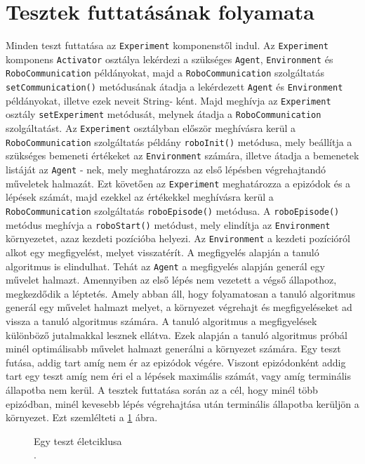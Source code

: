 \section{Tesztek futtatásának folyamata}\label{sec:TesztekFolyamata}
Minden teszt futtatása az \texttt{Experiment} komponenstől indul. Az \texttt{Experiment} komponens \texttt{Activator} osztálya lekérdezi a szükséges \texttt{Agent}, \texttt{Environment} és \texttt{RoboCommunication} példányokat, majd a \texttt{RoboCommunication} szolgáltatás \texttt{setCommunication()} metódusának átadja a lekérdezett \texttt{Agent} és \texttt{Environment} példányokat, illetve ezek neveit String- ként. Majd meghívja az \texttt{Experiment} osztály \texttt{setExperiment} metódusát, melynek átadja a \texttt{RoboCommunication} szolgáltatást. Az \texttt{Experiment} osztályban először meghívásra kerül a \texttt{RoboCommunication} szolgáltatás példány \texttt{roboInit()} metódusa, mely beállítja a szükséges bemeneti értékeket az \texttt{Environment} számára, illetve átadja a bemenetek listáját az \texttt{Agent} - nek, mely meghatározza az első lépésben végrehajtandó műveletek halmazát. Ezt követően az \texttt{Experiment} meghatározza a epizódok és a lépések számát, majd ezekkel az értékekkel meghívásra kerül a \texttt{RoboCommunication} szolgáltatás \texttt{roboEpisode()} metódusa. A \texttt{roboEpisode()} metódus meghívja a \texttt{roboStart()} metódust, mely elindítja az \texttt{Environment} környezetet, azaz kezdeti pozícióba helyezi. Az \texttt{Environment} a kezdeti pozícióról alkot egy megfigyelést, melyet visszatérít. A megfigyelés alapján a tanuló algoritmus is elindulhat. Tehát az \texttt{Agent} a megfigyelés alapján generál egy művelet halmazt. Amennyiben az első lépés nem vezetett a végső állapothoz, megkezdődik a léptetés. Amely abban áll, hogy folyamatosan a tanuló algoritmus generál egy művelet halmazt melyet, a környezet végrehajt és megfigyeléseket ad vissza a tanuló algoritmus számára. A tanuló algoritmus a megfigyelések különböző jutalmakkal lesznek ellátva. Ezek alapján a tanuló algoritmus próbál minél optimálisabb művelet halmazt generálni a környezet számára. Egy teszt futása, addig tart amíg nem ér az epizódok végére. Viszont epizódonként addig tart egy teszt amíg nem éri el a lépések maximális számát, vagy amíg terminális állapotba nem kerül. A tesztek futtatása során az a cél, hogy minél több epizódban, minél kevesebb lépés végrehajtása után terminális állapotba kerüljön a környezet. Ezt szemlélteti a \ref{fig:szekvencia} ábra.


\begin{figure}[h!]
  \centering
  \caption[Egy teszt életciklusa]%
  {Egy teszt életciklusa\\
  {\white .}\hfill\url{}}
  \label{fig:szekvencia}
\end{figure}


 



